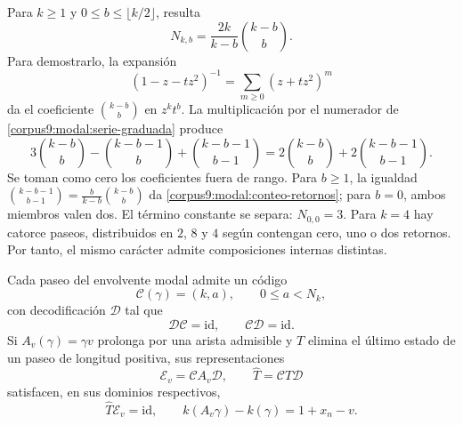 Para \(k\geq1\) y \(0\leq b\leq\lfloor k/2\rfloor\), resulta
\begin{equation}
 N_{k,b}=\frac{2k}{k-b}\binom{k-b}{b}.
 \label{corpus9:modal:conteo-retornos}
\end{equation}
Para demostrarlo, la expansión
\[
 (1-z-tz^2)^{-1}=\sum_{m\geq0}(z+tz^2)^m
\]
da el coeficiente \(\binom{k-b}{b}\) en \(z^kt^b\).
La multiplicación por el numerador de
\eqref{corpus9:modal:serie-graduada} produce
\[
 3\binom{k-b}{b}-\binom{k-b-1}{b}
   +\binom{k-b-1}{b-1}
 =2\binom{k-b}{b}+2\binom{k-b-1}{b-1}.
\]
Se toman como cero los coeficientes fuera de rango.
Para \(b\geq1\), la igualdad
\(\binom{k-b-1}{b-1}=\frac{b}{k-b}\binom{k-b}{b}\)
da \eqref{corpus9:modal:conteo-retornos}; para \(b=0\), ambos
miembros valen dos. El término constante se separa:
\(N_{0,0}=3\). Para \(k=4\) hay catorce paseos, distribuidos en
\(2\), \(8\) y \(4\) según contengan cero, uno o dos retornos.
Por tanto, el mismo carácter admite composiciones internas distintas.

\begin{proposition}
\label{corpus9:modal:recuperador}
Cada paseo del envolvente modal admite un código
\[
 \mathcal C(\gamma)=(k,a),\qquad 0\leq a<N_k,
\]
con decodificación \(\mathcal D\) tal que
\[
 \mathcal D\mathcal C=\mathrm{id},\qquad
 \mathcal C\mathcal D=\mathrm{id}.
\]
Si \(A_v(\gamma)=\gamma v\) prolonga por una arista admisible y
\(T\) elimina el último estado de un paseo de longitud positiva,
sus representaciones
\[
 \mathcal E_v=\mathcal C A_v\mathcal D,\qquad
 \widehat T=\mathcal C T\mathcal D
\]
satisfacen, en sus dominios respectivos,
\begin{equation}
 \widehat T\mathcal E_v=\mathrm{id},\qquad
 k(A_v\gamma)-k(\gamma)=1+x_n-v.
 \label{corpus9:modal:transporte-codigos}
\end{equation}
\end{proposition}

